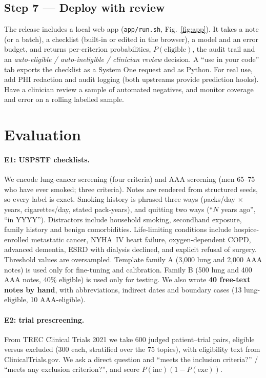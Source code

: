 \documentclass[11pt]{article}
\newcommand{\step}[1]{\subsection*{#1}}
\begin{document}
\step{Step 7 --- Deploy with review}
The release includes a local web app (\texttt{app/run.sh}, Fig.~\ref{fig:app}).
It takes a note (or a batch), a checklist (built-in or edited in the browser), a model and an error budget, and returns per-criterion probabilities, $P(\text{eligible})$, the audit trail and an \emph{auto-eligible / auto-ineligible / clinician review} decision.
A ``use in your code'' tab exports the checklist as a System One request and as Python.
For real use, add PHI redaction and audit logging (both upstreams provide prediction hooks).
Have a clinician review a sample of automated negatives, and monitor coverage and error on a rolling labelled sample.

\section{Evaluation}
\label{sec:eval}
\paragraph{E1: USPSTF checklists.}
We encode lung-cancer screening \citep{krist2021lung} (four criteria) and AAA screening \citep{owens2019aaa} (men 65--75 who have ever smoked; three criteria).
Notes are rendered from structured seeds, so every label is exact.
Smoking history is phrased three ways (packs/day $\times$ years, cigarettes/day, stated pack-years), and quitting two ways (``$N$ years ago'', ``in YYYY'').
Distractors include household smoking, secondhand exposure, family history and benign comorbidities.
Life-limiting conditions include hospice-enrolled metastatic cancer, NYHA~IV heart failure, oxygen-dependent COPD, advanced dementia, ESRD with dialysis declined, and explicit refusal of surgery.
Threshold values are oversampled.
Template family A (3{,}000 lung and 2{,}000 AAA notes) is used only for fine-tuning and calibration.
Family B (500 lung and 400 AAA notes, 40\% eligible) is used only for testing.
We also wrote \textbf{40 free-text notes by hand}, with abbreviations, indirect dates and boundary cases (13 lung-eligible, 10 AAA-eligible).
\paragraph{E2: trial prescreening.}
From TREC Clinical Trials 2021 \citep{roberts2021trec} we take 600 judged patient--trial pairs, eligible versus excluded (300 each, stratified over the 75 topics), with eligibility text from ClinicalTrials.gov.
We ask a direct question and ``meets the inclusion criteria?'' / ``meets any exclusion criterion?'', and score $P(\text{inc})(1-P(\text{exc}))$.
\end{document}

